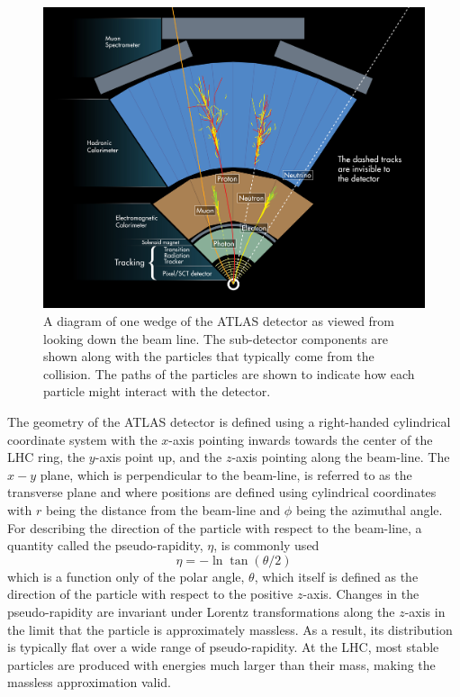 \begin{figure}[ht!]
\centering
\includegraphics[width=.9\textwidth]{figures/atlas/wedge.jpg}
\caption{A diagram of one wedge of the ATLAS detector
as viewed from looking down the beam line. 
The sub-detector components are shown along with the 
particles that typically come from the collision.
The paths of the particles are shown to indicate how each particle 
might interact with the detector.}
\label{fig:atlas_wedge}
\end{figure}

The geometry of the ATLAS detector is defined using a 
right-handed cylindrical coordinate system with the $x$-axis
pointing inwards towards the center of the LHC ring, the $y$-axis point
up, and the $z$-axis pointing along the beam-line.
The $x-y$ plane, which is perpendicular to the beam-line,
is referred to as the transverse plane and where positions are  
defined using cylindrical coordinates with $r$ being the distance
from the beam-line and $\phi$ being the azimuthal angle.
For describing the direction of the particle with respect 
to the beam-line, a quantity called the pseudo-rapidity, $\eta$, is commonly
used
\begin{equation}
\eta = -\ln \tan (\theta/2) 
\label{eq:pseudorapidity}
\end{equation}
which is a function only of the polar angle, $\theta$, which 
itself is defined
as the direction of the particle with respect to the positive $z$-axis.
Changes in the pseudo-rapidity are 
invariant under Lorentz transformations along
the $z$-axis in the limit that the particle is approximately massless. 
As a result, its distribution is typically flat over
a wide range of pseudo-rapidity. At the LHC, most stable particles 
are produced with energies much larger than their mass, making the 
massless approximation valid.

